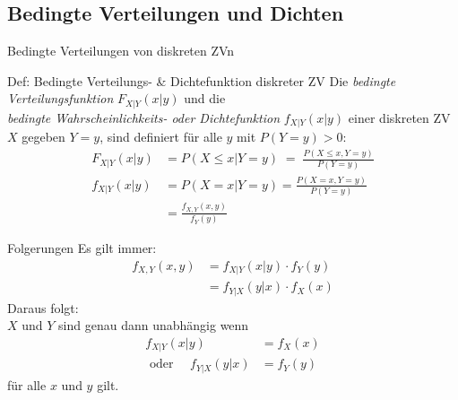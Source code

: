 \documentclass[
  10pt,
  ignorenonframetext,
]{beamer}
\begin{document}
\subsection{Bedingte Verteilungen und
Dichten}\label{bedingte-verteilungen-und-dichten}

\begin{frame}{Bedingte Verteilungen von diskreten ZVn}
\label{bedingte-verteilungen-von-diskreten-zvn}
\begin{block}{Def: Bedingte Verteilungs- \& Dichtefunktion diskreter ZV}
\label{def-bedingte-verteilungs--dichtefunktion-diskreter-zv}
Die \emph{bedingte Verteilungsfunktion} \(F_{X|Y}(x|y)\) und die\\
\emph{bedingte Wahrscheinlichkeits- oder Dichtefunktion}
\(f_{X|Y}(x|y)\) einer diskreten ZV \(X\) gegeben \(Y = y\), sind
definiert für alle \(y\) mit \(P(Y = y) > 0\): \begin{align*}
F_{X|Y}(x|y)  & =  P(X \leq x|Y = y) \; = \;
\frac{P(X \leq x, Y = y)}{P(Y = y)}\\
f_{X|Y}(x|y) & =  P(X = x|Y = y) = \frac{P(X = x, Y = y)}{P(Y = y)}\\
& =  \frac{f_{X,Y}(x,y)}{f_Y(y)}
\end{align*}
\end{block}
\end{frame}

\begin{frame}{Folgerungen}
\label{folgerungen-4}
Es gilt immer: \begin{align*}
f_{X,Y}(x,y) & =  f_{X|Y}(x|y) \cdot f_Y(y)\\
& =  f_{Y|X}(y|x) \cdot f_X(x)
\end{align*} Daraus folgt:\\
\(X\) und \(Y\) sind genau dann unabhängig wenn \begin{align*}
f_{X|Y}(x|y) & =  f_X(x) \\
\mbox{ oder }\quad
f_{Y|X}(y|x) & =  f_Y(y)
\end{align*} für alle \(x\) und \(y\) gilt.
\end{frame}
\end{document}
